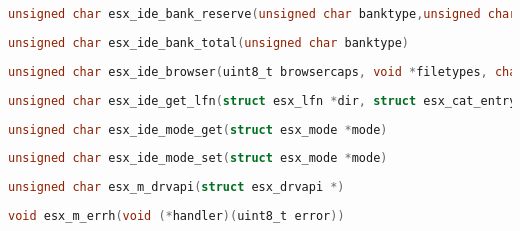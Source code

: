 \documentclass[11pt]{book}
\def\lthtmlcheckvsize{\ifdim\ht\sizebox<\vsize 
  \ifdim\wd\sizebox<\hsize\expandafter\hfill\fi \expandafter\vfill
  \else\expandafter\vss\fi}%
\begin{document}
{\newpage\clearpage
{}%
\begin{lstlisting}[language=C]
unsigned char esx_ide_bank_reserve(unsigned char banktype,unsigned char page)
\end{lstlisting}%
\lthtmlfigureZ
\lthtmlcheckvsize\clearpage}

{\newpage\clearpage
{}%
\begin{lstlisting}[language=C]
unsigned char esx_ide_bank_total(unsigned char banktype)
\end{lstlisting}%
\lthtmlfigureZ
\lthtmlcheckvsize\clearpage}

{\newpage\clearpage
{}%
\begin{lstlisting}[language=C]
unsigned char esx_ide_browser(uint8_t browsercaps, void *filetypes, char *help,char *dst_sfn, char *dst_lfn)
\end{lstlisting}%
\lthtmlfigureZ
\lthtmlcheckvsize\clearpage}

{\newpage\clearpage
{}%
\begin{lstlisting}[language=C]
unsigned char esx_ide_get_lfn(struct esx_lfn *dir, struct esx_cat_entry *query)
\end{lstlisting}%
\lthtmlfigureZ
\lthtmlcheckvsize\clearpage}

{\newpage\clearpage
{}%
\begin{lstlisting}[language=C]
unsigned char esx_ide_mode_get(struct esx_mode *mode)
\end{lstlisting}%
\lthtmlfigureZ
\lthtmlcheckvsize\clearpage}

{\newpage\clearpage
{}%
\begin{lstlisting}[language=C]
unsigned char esx_ide_mode_set(struct esx_mode *mode)
\end{lstlisting}%
\lthtmlfigureZ
\lthtmlcheckvsize\clearpage}

{\newpage\clearpage
{}%
\begin{lstlisting}[language=C]
unsigned char esx_m_drvapi(struct esx_drvapi *)
\end{lstlisting}%
\lthtmlfigureZ
\lthtmlcheckvsize\clearpage}

{\newpage\clearpage
{}%
\begin{lstlisting}[language=C]
void esx_m_errh(void (*handler)(uint8_t error))
\end{lstlisting}%
\lthtmlfigureZ
\lthtmlcheckvsize\clearpage}
\end{document}
